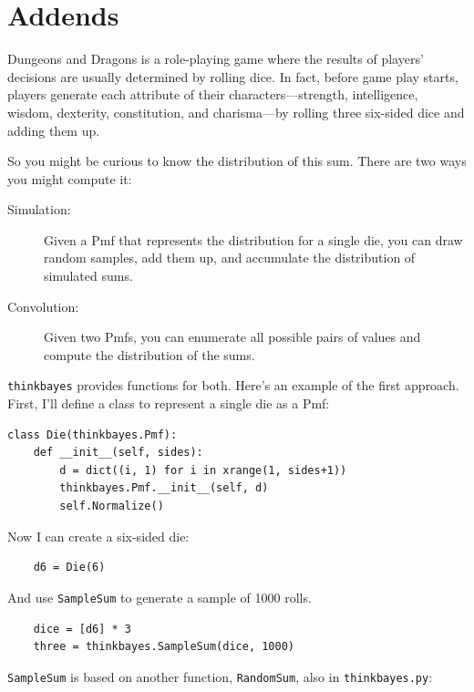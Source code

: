 \documentclass[12pt]{book}
\begin{document}
\section{Addends}
\label{addends}

Dungeons and Dragons is a role-playing game where the results
of players' decisions are usually determined by rolling dice.
In fact, before game play starts, players generate each
attribute of their characters---strength, intelligence, wisdom,
dexterity, constitution, and charisma---by rolling three
six-sided dice and adding them up.

So you might be curious to know the distribution of this sum.
There are two ways you might compute it:

\begin{description}

\item[Simulation:] Given a Pmf that represents the distribution
for a single die, you can draw random samples, add them up,
and accumulate the distribution of simulated sums.

\item[Convolution:] Given two Pmfs, you can enumerate all possible
pairs of values and compute the distribution of the sums.

\end{description}

\verb"thinkbayes" provides functions for both.  Here's an example
of the first approach.  First, I'll define a class to represent
a single die as a Pmf:

\begin{verbatim}
class Die(thinkbayes.Pmf):
    def __init__(self, sides):
        d = dict((i, 1) for i in xrange(1, sides+1))
        thinkbayes.Pmf.__init__(self, d)
        self.Normalize()
\end{verbatim}

Now I can create a six-sided die:

\begin{verbatim}
    d6 = Die(6)
\end{verbatim}

And use \verb"SampleSum" to generate a sample of 1000 rolls.

\begin{verbatim}
    dice = [d6] * 3
    three = thinkbayes.SampleSum(dice, 1000)
\end{verbatim}

\verb"SampleSum" is based on another function, \verb"RandomSum",
also in \verb"thinkbayes.py":
\end{document}
